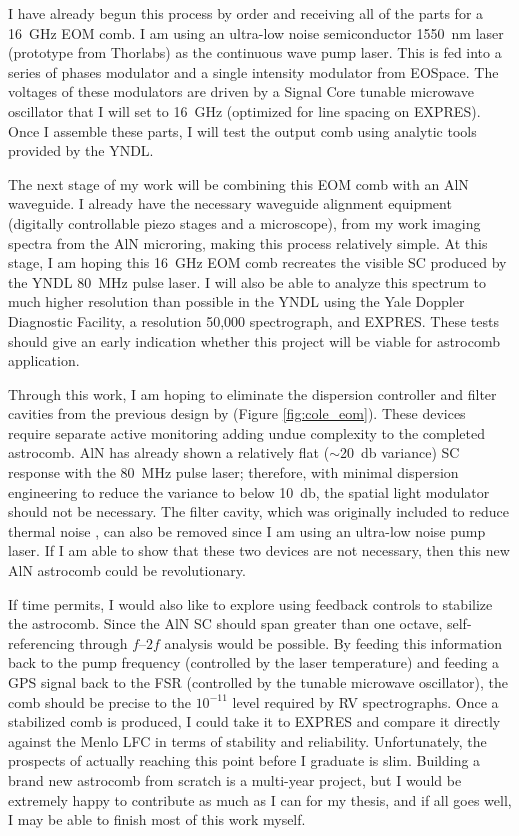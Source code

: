 \documentclass[11pt]{article}
\begin{document}
I have already begun this process by order and receiving all of the parts for a \SI{16}{\giga\hertz} EOM comb. I am using an ultra-low noise semiconductor \SI{1550}{\nano\meter} laser (prototype from Thorlabs) as the continuous wave pump laser. This is fed into a series of phases modulator and a single intensity modulator from EOSpace. The voltages of these modulators are driven by a Signal Core tunable microwave oscillator that I will set to \SI{16}{\giga\hertz} (optimized for line spacing on EXPRES). Once I assemble these parts, I will test the output comb using analytic tools provided by the YNDL.

The next stage of my work will be combining this EOM comb with an AlN waveguide. I already have the necessary waveguide alignment equipment (digitally controllable piezo stages and a microscope), from my work imaging spectra from the AlN microring, making this process relatively simple. At this stage, I am hoping this \SI{16}{\giga\hertz} EOM comb recreates the visible SC produced by the YNDL \SI{80}{\mega\hertz} pulse laser. I will also be able to analyze this spectrum to much higher resolution than possible in the YNDL using the Yale Doppler Diagnostic Facility, a resolution 50,000 spectrograph, and EXPRES. These tests should give an early indication whether this project will be viable for astrocomb application.

Through this work, I am hoping to eliminate the dispersion controller and filter cavities from the previous design by \citet{Cole2015} (Figure \ref{fig:cole_eom}). These devices require separate active monitoring adding undue complexity to the completed astrocomb. AlN has already shown a relatively flat ($\sim$\SI{20}{\decibel} variance) SC response with the \SI{80}{\mega\hertz} pulse laser; therefore, with minimal dispersion engineering to reduce the variance to below \SI{10}{\decibel}, the spatial light modulator should not be necessary. The filter cavity, which was originally included to reduce thermal noise \citep{Carlson2017a}, can also be removed since I am using an ultra-low noise pump laser. If I am able to show that these two devices are not necessary, then this new AlN astrocomb could be revolutionary.

If time permits, I would also like to explore using feedback controls to stabilize the astrocomb. Since the AlN SC should span greater than one octave, self-referencing through $f$--$2f$ analysis would be possible. By feeding this information back to the pump frequency (controlled by the laser temperature) and feeding a GPS signal back to the FSR (controlled by the tunable microwave oscillator), the comb should be precise to the $10^{-11}$ level required by RV spectrographs. Once a stabilized comb is produced, I could take it to EXPRES and compare it directly against the Menlo LFC in terms of stability and reliability. Unfortunately, the prospects of actually reaching this point before I graduate is slim. Building a brand new astrocomb from scratch is a multi-year project, but I would be extremely happy to contribute as much as I can for my thesis, and if all goes well, I may be able to finish most of this work myself.
\end{document}
